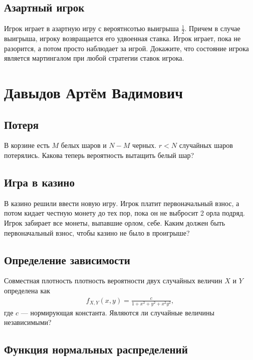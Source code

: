 \documentclass[12pt]{article}
\begin{document}
\subsection{Азартный игрок}

Игрок играет в азартную игру с вероятнсотью выигрыша $\frac{1}{2}$. Причем в случае выигрыша, игроку возвращается его удвоенная ставка. Игрок играет, пока не разорится, а потом просто наблюдает за игрой. Докажите, что состояние игрока является мартингалом при любой стратегии ставок игрока.



\newpage
\section{Давыдов Артём Вадимович}

\subsection{Потеря}

В корзине есть $M$ белых шаров и $N - M$ черных. $r < N$ случайных шаров потерялись. Какова теперь вероятность вытащить белый шар?



\subsection{Игра в казино}

В казино решили ввести новую игру. Игрок платит первоначальный взнос, а потом кидает честную монету до тех пор, пока он не выбросит 2 орла подряд. Игрок забирает все монеты, выпавшие орлом, себе. Каким должен быть первоначальный взнос, чтобы казино не было в проигрыше?



\subsection{Определение зависимости}

Совместная плотность плотность вероятности двух случайных величин $X$ и $Y$ определена как
\begin{align*}
    f_{X, Y}(x, y) = \frac{c}{1 + x^2 + y^2 + x^2y^2},
\end{align*}
где $c$ --- нормирующая константа. Являются ли случайные величины независимыми?



\subsection{Функция нормальных распределений}
\end{document}
